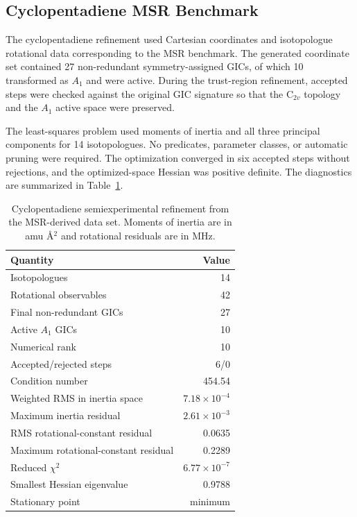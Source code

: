 \documentclass[journal=jctcce,manuscript=article,maxauthors=999]{achemso}
\begin{document}
\subsection{Cyclopentadiene MSR Benchmark}

The cyclopentadiene refinement used Cartesian coordinates and isotopologue
rotational data corresponding to the MSR benchmark. The generated coordinate
set contained 27 non-redundant symmetry-assigned GICs, of which 10 transformed
as $A_1$ and were active. During the trust-region refinement, accepted steps
were checked against the original GIC signature so that the C$_{2v}$ topology
and the $A_1$ active space were preserved.

The least-squares problem used moments of inertia and all three principal
components for 14 isotopologues. No predicates, parameter classes, or automatic
pruning were required. The optimization converged in six accepted steps without
rejections, and the optimized-space Hessian was positive definite. The
diagnostics are summarized in Table~\ref{tab:cyclopentadiene-fit}.

\begin{table}
\caption{Cyclopentadiene semiexperimental refinement from the MSR-derived data set. Moments of inertia are in amu \AA$^2$ and rotational residuals are in MHz.}
\label{tab:cyclopentadiene-fit}
\begin{tabular}{lr}
\toprule
Quantity & Value \\
\midrule
Isotopologues & 14 \\
Rotational observables & 42 \\
Final non-redundant GICs & 27 \\
Active $A_1$ GICs & 10 \\
Numerical rank & 10 \\
Accepted/rejected steps & 6/0 \\
Condition number & 454.54 \\
Weighted RMS in inertia space & $7.18\times10^{-4}$ \\
Maximum inertia residual & $2.61\times10^{-3}$ \\
RMS rotational-constant residual & 0.0635 \\
Maximum rotational-constant residual & 0.2289 \\
Reduced $\chi^2$ & $6.77\times10^{-7}$ \\
Smallest Hessian eigenvalue & 0.9788 \\
Stationary point & minimum \\
\bottomrule
\end{tabular}
\end{table}
\end{document}
